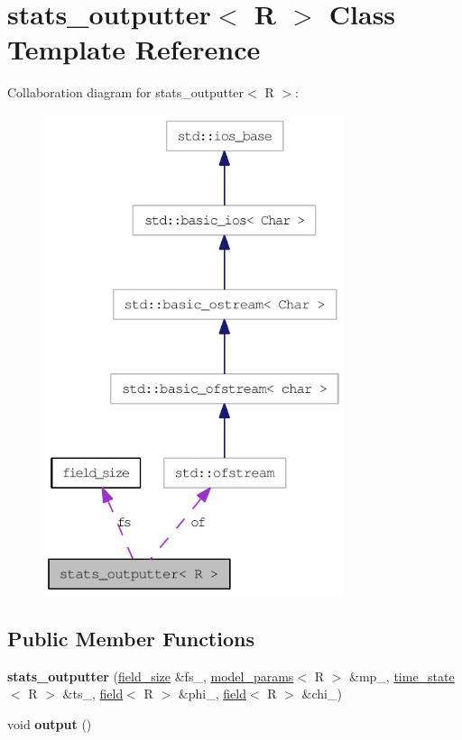 \hypertarget{classstats__outputter}{
\section{stats\_\-outputter$<$ R $>$ Class Template Reference}
\label{classstats__outputter}
}
Collaboration diagram for stats\_\-outputter$<$ R $>$:\nopagebreak
\begin{figure}[H]
\begin{center}
\leavevmode
\includegraphics[width=250pt]{classstats__outputter__coll__graph}
\end{center}
\end{figure}
\subsection*{Public Member Functions}
\begin{DoxyCompactItemize}
\item 
\hypertarget{classstats__outputter_a314e0484abd5002e82591e0e4bef02b5}{
{\bfseries stats\_\-outputter} (\hyperlink{structfield__size}{field\_\-size} \&fs\_\-, \hyperlink{structmodel__params}{model\_\-params}$<$ R $>$ \&mp\_\-, \hyperlink{structtime__state}{time\_\-state}$<$ R $>$ \&ts\_\-, \hyperlink{classfield}{field}$<$ R $>$ \&phi\_\-, \hyperlink{classfield}{field}$<$ R $>$ \&chi\_\-)}
\label{classstats__outputter_a314e0484abd5002e82591e0e4bef02b5}

\item 
\hypertarget{classstats__outputter_aaeccf7473d48bec8a138e30f93f9fb9a}{
void {\bfseries output} ()}
\label{classstats__outputter_aaeccf7473d48bec8a138e30f93f9fb9a}

\end{DoxyCompactItemize}
